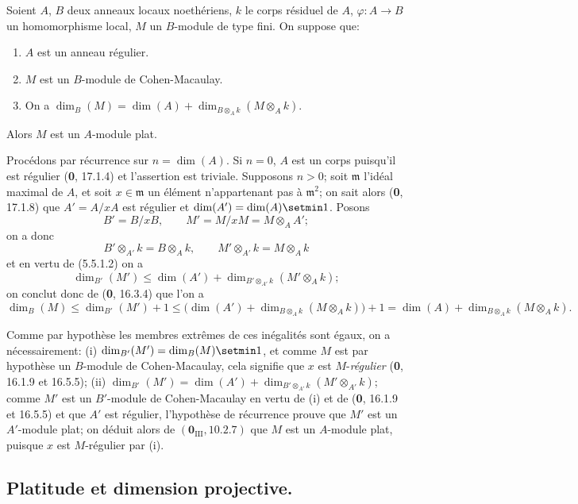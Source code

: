 \begin{proposition}[6.1.5]
Soient $A$, $B$ deux anneaux locaux noethériens, $k$ le corps résiduel de
$A$, $\varphi:A\to B$ un homomorphisme local, $M$ un $B$-module de type fini.
On suppose que:
\begin{enumerate}
\item[\textup{1\textsuperscript{o}}] $A$ est un anneau régulier.
\item[\textup{2\textsuperscript{o}}] $M$ est un $B$-module de Cohen-Macaulay.
\item[\textup{3\textsuperscript{o}}] On a
$\dim_B(M)=\dim(A)+\dim_{B\otimes_Ak}(M\otimes_Ak)$.
\end{enumerate}

Alors $M$ est un $A$-module plat.
\end{proposition}

Procédons par récurrence sur $n=\dim(A)$. Si $n=0$, $A$ est un corps
puisqu'il est régulier (\textbf{0}, 17.1.4) et l'assertion est triviale. Supposons
$n>0$; soit $\mathfrak m$ l'idéal maximal de $A$, et soit
$x\in\mathfrak m$ un élément n'appartenant pas à $\mathfrak m^2$; on sait
alors (\textbf{0}, 17.1.8) que $A'=A/xA$ est régulier et
$\dim(A')=\dim(A)\setmin 1$. Posons
\[
B'=B/xB,\qquad M'=M/xM=M\otimes_AA';
\]
on a donc
\[
B'\otimes_{A'}k=B\otimes_Ak,\qquad
M'\otimes_{A'}k=M\otimes_Ak
\]
et en vertu de (5.5.1.2) on a
\[
\dim_{B'}(M')\leq\dim(A')+
\dim_{B'\otimes_{A'}k}(M'\otimes_Ak);
\]
on conclut donc de (\textbf{0}, 16.3.4) que l'on a
\[
\dim_B(M)\leq\dim_{B'}(M')+1
\leq\bigl(\dim(A')+
\dim_{B\otimes_Ak}(M\otimes_Ak)\bigr)+1
=\dim(A)+\dim_{B\otimes_Ak}(M\otimes_Ak).
\]

Comme par hypothèse les membres extrêmes de ces inégalités sont égaux, on
a nécessairement: (i) $\dim_{B'}(M')=\dim_B(M)\setmin 1$, et comme $M$ est par
hypothèse un $B$-module de Cohen-Macaulay, cela signifie que $x$ est
$M$-\emph{régulier} (\textbf{0}, 16.1.9 et 16.5.5); (ii)
$\dim_{B'}(M')=\dim(A')+
\dim_{B'\otimes_{A'}k}(M'\otimes_{A'}k)$; comme $M'$ est un $B'$-module de
Cohen-Macaulay en vertu de (i) et de (\textbf{0}, 16.1.9 et 16.5.5) et que $A'$ est
régulier, l'hypothèse de récurrence prouve que $M'$ est un $A'$-module plat;
on déduit alors de $(\mathbf{0}_{\mathrm{III}}, 10.2.7)$ que $M$ est un $A$-module
plat, puisque $x$ est $M$-régulier par (i).

\subsection{Platitude et dimension projective.}

